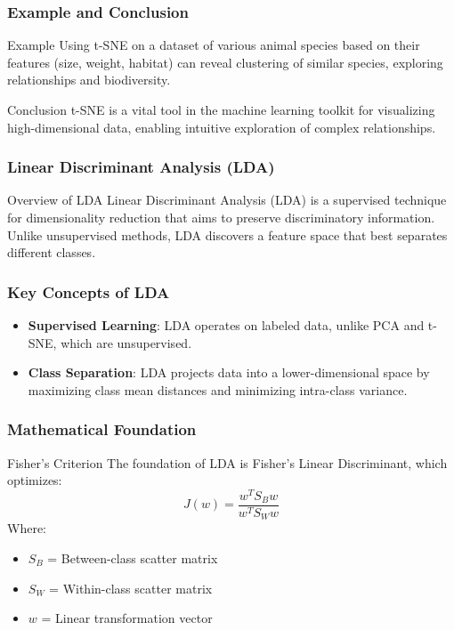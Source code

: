 \documentclass[aspectratio=169]{beamer}
\begin{document}
\begin{frame}[fragile]
    \frametitle{Example and Conclusion}
    \begin{block}{Example}
        Using t-SNE on a dataset of various animal species based on their features (size, weight, habitat) can reveal clustering of similar species, exploring relationships and biodiversity.
    \end{block}
    
    \begin{block}{Conclusion}
        t-SNE is a vital tool in the machine learning toolkit for visualizing high-dimensional data, enabling intuitive exploration of complex relationships.
    \end{block}
\end{frame}

\begin{frame}[fragile]
    \frametitle{Linear Discriminant Analysis (LDA)}
    \begin{block}{Overview of LDA}
        Linear Discriminant Analysis (LDA) is a supervised technique for dimensionality reduction that aims to preserve discriminatory information. Unlike unsupervised methods, LDA discovers a feature space that best separates different classes.
    \end{block}
\end{frame}

\begin{frame}[fragile]
    \frametitle{Key Concepts of LDA}
    \begin{itemize}
        \item \textbf{Supervised Learning}: LDA operates on labeled data, unlike PCA and t-SNE, which are unsupervised.
        \item \textbf{Class Separation}: LDA projects data into a lower-dimensional space by maximizing class mean distances and minimizing intra-class variance.
    \end{itemize}
\end{frame}

\begin{frame}[fragile]
    \frametitle{Mathematical Foundation}
    \begin{block}{Fisher's Criterion}
        The foundation of LDA is Fisher's Linear Discriminant, which optimizes:
        \begin{equation}
            J(w) = \frac{w^T S_B w}{w^T S_W w}
        \end{equation}
        Where:
        \begin{itemize}
            \item $S_B$ = Between-class scatter matrix
            \item $S_W$ = Within-class scatter matrix
            \item $w$ = Linear transformation vector
        \end{itemize}
    \end{block}
\end{frame}
\end{document}
